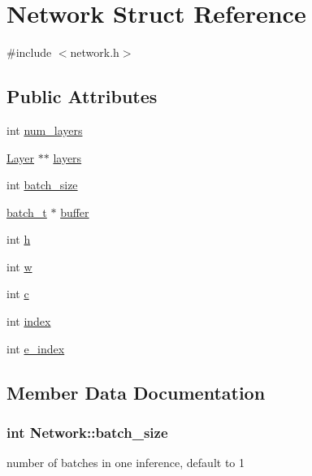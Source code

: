 \hypertarget{structNetwork}{}\section{Network Struct Reference}
\label{structNetwork}


{\ttfamily \#include $<$network.\+h$>$}

\subsection*{Public Attributes}
\begin{DoxyCompactItemize}
\item 
int \hyperlink{structNetwork_aa451a7979d7e781e7bccc4d4c0fcf133}{num\+\_\+layers}
\item 
\hyperlink{structLayer}{Layer} $\ast$$\ast$ \hyperlink{structNetwork_a409fd1196f91871f40465bc914c8469d}{layers}
\item 
int \hyperlink{structNetwork_ad66f20cd215655ea2d3f9d10d45b4ec2}{batch\+\_\+size}
\item 
\hyperlink{network_8h_ad48307c6437d8da3206a07e54257c89f}{batch\+\_\+t} $\ast$ \hyperlink{structNetwork_a62d9738438f06b213ac9cc2fa05d2e41}{buffer}
\item 
int \hyperlink{structNetwork_a9a89cd9f1a81ccc8e1ca1b748cb6322f}{h}
\item 
int \hyperlink{structNetwork_aa717aa8318a8498353e198eba3d191ea}{w}
\item 
int \hyperlink{structNetwork_ab981932a6bab821f3e04aef9fe888051}{c}
\item 
int \hyperlink{structNetwork_a1b4ffc833bb85932b56477680948f24a}{index}
\item 
int \hyperlink{structNetwork_a52ba4784c1ac8dba38c98987edb94fd0}{e\+\_\+index}
\end{DoxyCompactItemize}


\subsection{Member Data Documentation}
\subsubsection[{batch\+\_\+size}]{\setlength{\rightskip}{0pt plus 5cm}int Network\+::batch\+\_\+size}\hypertarget{structNetwork_ad66f20cd215655ea2d3f9d10d45b4ec2}{}\label{structNetwork_ad66f20cd215655ea2d3f9d10d45b4ec2}
number of batches in one inference, default to 1 
